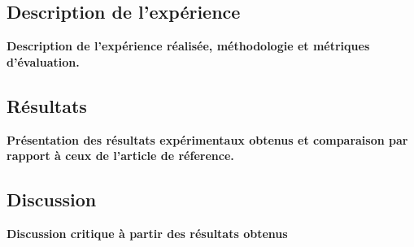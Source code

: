 

\subsection{Description de l'expérience}
 
\textbf{Description de l'expérience réalisée, méthodologie et métriques d'évaluation.} \\


\subsection{Résultats}
 
\textbf{Présentation des résultats expérimentaux obtenus et  comparaison par rapport à ceux de l’article de réference.} \\


\subsection{Discussion}

\textbf{Discussion critique à partir des
résultats obtenus} \\



